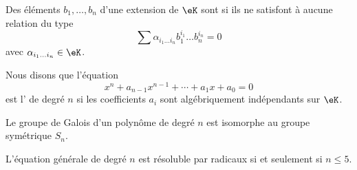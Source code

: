 \begin{definition}
    Des éléments \( b_1,\ldots, b_n\) d'une extension de \( \eK\) sont  si ils ne satisfont à aucune relation du type
    \begin{equation}
        \sum \alpha_{i_1\ldots i_n}b_1^{i_1}\ldots b_n^{i_n}=0
    \end{equation}
    avec \( \alpha_{i_1\ldots i_n}\in \eK\).
\end{definition}

Nous disons que l'équation
\begin{equation}
    x^n+a_{n-1}x^{n-1}+\cdots+a_1x+a_0=0
\end{equation}
est l' de degré \( n\) si les coefficients \( a_i\) sont algébriquement indépendants sur \( \eK\).

\begin{theorem}
    Le groupe de Galois d'un polynôme de degré \( n\) est isomorphe au groupe symétrique \( S_n\).
\end{theorem}

\begin{corollary}
    L'équation générale de degré \( n\) est résoluble par radicaux si et seulement si \( n\le 5\).
\end{corollary}
